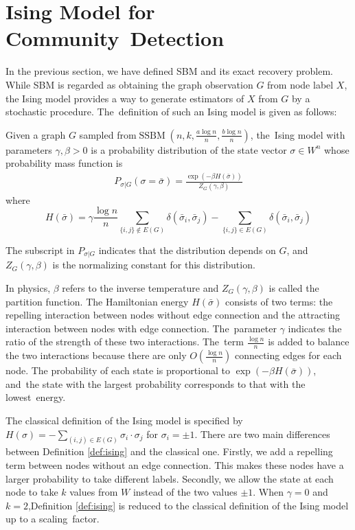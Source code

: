\documentclass[entropy,article,accept,moreauthors,pdftex]{Definitions/mdpi}
\newcommand{\A}{\frac{a \log n}{n}}
\newcommand{\B}{\frac{b \log n}{n}}
\newcommand{\1}{\mathbbm{1}}
\DeclareMathOperator{\SSBM}{SSBM}
\begin{document}
\section{Ising Model for Community~Detection}\label{sec:sibm}
In the previous section, we have defined SBM and its exact recovery problem.  While SBM is regarded as obtaining
the graph observation $G$ from node label $X$, the Ising model provides a way to generate estimators of $X$ from $G$
by a stochastic procedure. The~definition of such an Ising model is given
as follows:
\begin{Definition}\label{def:ising}
	Given a graph $G$ sampled from\linebreak $\SSBM(n,k,\A,\B)$, the~Ising model with parameters $\gamma,\beta>0$
	is a probability distribution of the state vector $\sigma\in W^n$ whose probability mass function is
\begin{align} \label{eq:isingma}
	P_{\sigma|G}(\sigma=\bar{\sigma})=\frac{\exp(-\beta H(\bar{\sigma}))}{Z_G(\gamma,\beta)}
	\end{align}
	where
\begin{equation}\label{eq:energy}
	H(\bar{\sigma}) = \gamma \frac{\log n}{n} \sum_{\{i,j\}\not\in E(G)} \delta(\bar{\sigma}_i, \bar{\sigma}_j)
	- \sum_{\{i,j\}\in E(G)} \delta(\bar{\sigma}_i, \bar{\sigma}_j)
	\end{equation}
	
	The subscript in $P_{\sigma|G}$ indicates that the distribution depends on $G$, and~	$Z_G(\gamma,\beta)$ is the normalizing constant for this distribution.
\end{Definition}
In physics, $\beta$ refers to the inverse temperature and $Z_G(\gamma, \beta)$ is called the partition function.
The Hamiltonian energy $H(\bar{\sigma})$ consists of two terms: the repelling interaction between nodes without edge connection
and the attracting interaction between nodes with edge connection. The~parameter $\gamma$ indicates the ratio of the strength of these two
interactions. The~term $\frac{\log n}{n}$ is added to balance the two interactions because there are only $O(\frac{\log n}{n})$
connecting edges for each node.
The probability of each state is proportional to $\exp(-\beta H(\bar{\sigma}))$, and~the state with the largest
probability corresponds to that with the lowest~energy.

The classical definition of the Ising model is specified by $H(\sigma)=-\sum_{(i,j)\in E(G)} \sigma_i \cdot \sigma_j$ for
$\sigma_i = \pm 1$.
There are two main differences between Definition \ref{def:ising} and the classical one. Firstly, we add a repelling term
between nodes without an edge connection. This makes these nodes have a larger probability to take different labels.
Secondly, we allow the state at each node to take $k$ values from $W$ instead of the two values $\pm 1$.
When $\gamma = 0$ and $k=2$,\linebreak Definition \ref{def:ising}
is reduced to the classical definition of the Ising model up to a scaling~factor.
\end{document}
